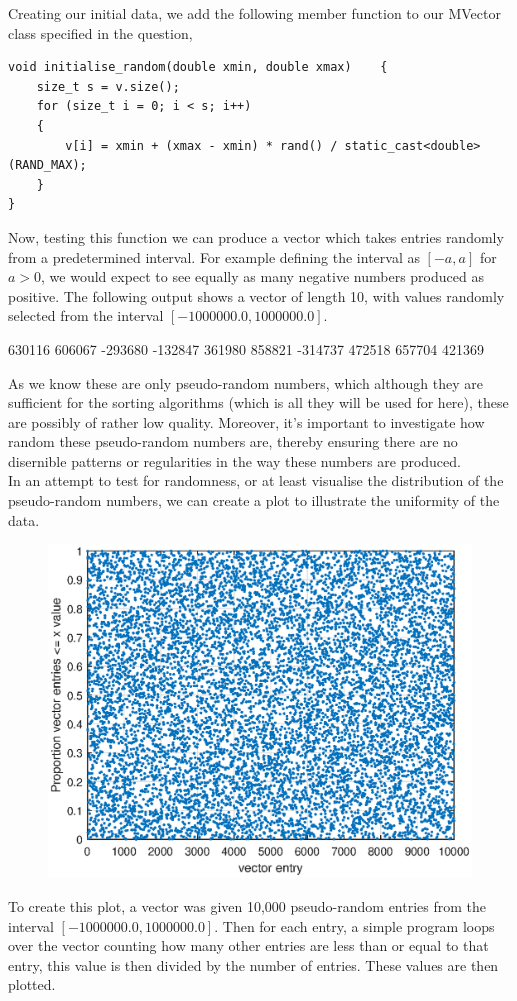 \documentclass[a4paper, 12pt]{article}
\begin{document}
Creating our initial data, we add the following member function to our MVector class specified in the question,
\begin{verbatim}
void initialise_random(double xmin, double xmax)	{
	size_t s = v.size();
	for (size_t i = 0; i < s; i++)
	{
		v[i] = xmin + (xmax - xmin) * rand() / static_cast<double>(RAND_MAX);
	}
}
\end{verbatim} 
Now, testing this function we can produce a vector which takes entries randomly from a predetermined interval. For example defining the interval as $[-a,a]$ for $a>0$, we would expect to see equally as many negative numbers produced as positive. The following output shows a vector of length 10, with values randomly selected from the interval $[-1000000.0,1000000.0]$.
\begin{spverbatim}
630116 606067 -293680 -132847 361980 858821 -314737 472518 657704 421369
\end{spverbatim} 
As we know these are only pseudo-random numbers, which although they are sufficient for the sorting algorithms (which is all they will be used for here), these are possibly of rather low quality. Moreover, it's important to investigate how random these pseudo-random numbers are, thereby ensuring there are no disernible patterns or regularities in the way these numbers are produced.\\

In an attempt to test for randomness, or at least visualise the distribution of the pseudo-random numbers, we can create a plot to illustrate the uniformity of the data.  
\begin{figure}[H]
\centering
\includegraphics[scale=0.75]{test_random1}
\end{figure}
To create this plot, a vector was given 10,000 pseudo-random entries from the interval $[-1000000.0,1000000.0]$. Then for each entry, a simple program loops over the vector counting how many other entries are less than or equal to that entry, this value is then divided by the number of entries. These values are then plotted.\\
\end{document}
